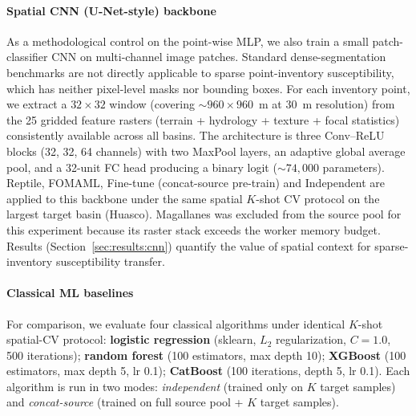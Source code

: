 \paragraph{Spatial CNN (U-Net-style) backbone} As a methodological control on the point-wise MLP, we also train a small patch-classifier CNN on multi-channel image patches. Standard dense-segmentation benchmarks are not directly applicable to sparse point-inventory susceptibility, which has neither pixel-level masks nor bounding boxes.  For each inventory point, we extract a $32 \times 32$ window (covering $\sim 960 \times 960$~m at 30~m resolution) from the 25 gridded feature rasters (terrain + hydrology + texture + focal statistics) consistently available across all basins.  The architecture is three Conv--ReLU blocks (32, 32, 64 channels) with two MaxPool layers, an adaptive global average pool, and a 32-unit FC head producing a binary logit ($\sim 74{,}000$ parameters). Reptile, FOMAML, Fine-tune (concat-source pre-train) and Independent are applied to this backbone under the same spatial $K$-shot CV protocol on the largest target basin (Huasco).  Magallanes was excluded from the source pool for this experiment because its raster stack exceeds the worker memory budget. Results (Section~\ref{sec:results:cnn}) quantify the value of spatial context for sparse-inventory susceptibility transfer.

\paragraph{Classical ML baselines} For comparison, we evaluate four classical algorithms under identical $K$-shot spatial-CV protocol: \textbf{logistic regression} (sklearn, $L_2$ regularization, $C=1.0$, 500 iterations); \textbf{random forest} (100 estimators, max depth 10); \textbf{XGBoost} (100 estimators, max depth 5, lr 0.1); \textbf{CatBoost} (100 iterations, depth 5, lr 0.1). Each algorithm is run in two modes: \emph{independent} (trained only on $K$ target samples) and \emph{concat-source} (trained on full source pool + $K$ target samples).

\paragraph{} 

